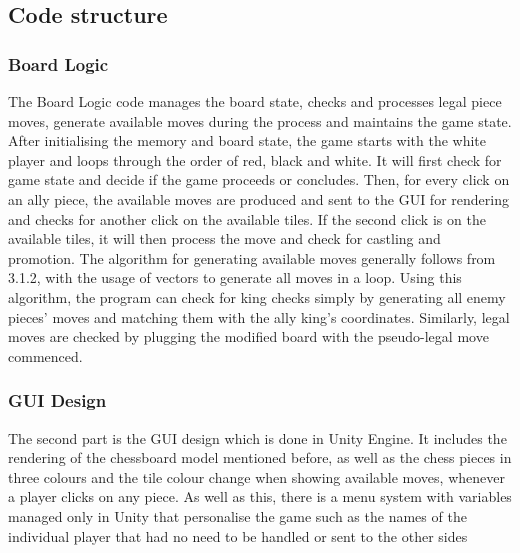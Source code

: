 \documentclass[10pt]{article}
\begin{document}
\subsection{Code structure}
\subsubsection{Board Logic}
The Board Logic code manages the board state, checks and processes legal piece moves, generate available moves during the process and maintains the game state. After initialising the memory and board state, the game starts with the white player and loops through the order of red, black and white. It will first check for game state and decide if the game proceeds or concludes. Then, for every click on an ally piece, the available moves are produced and sent to the GUI for rendering and checks for another click on the available tiles. If the second click is on the available tiles, it will then process the move and check for castling and promotion.\newline
The algorithm for generating available moves generally follows from 3.1.2, with the usage of vectors to generate all moves in a loop. Using this algorithm, the program can check for king checks simply by generating all enemy pieces' moves and matching them with the ally king's coordinates. Similarly, legal moves are checked by plugging the modified board with the pseudo-legal move commenced.
\subsubsection{GUI Design}
The second part is the GUI design which is done in Unity Engine. It includes the rendering of the chessboard model mentioned before, as well as the chess pieces in three colours and the tile colour change when showing available moves, whenever a player clicks on any piece. As well as this, there is a menu system with variables managed only in Unity that personalise the game such as the names of the individual player that had no need to be handled or sent to the other sides
\end{document}
